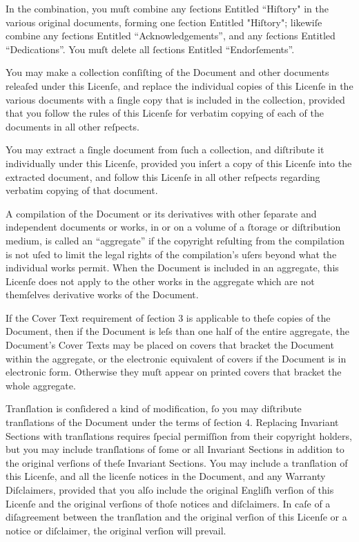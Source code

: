 In the combination, you muſt combine any ſections Entitled “Hiſtory" in 
the various original documents, forming one ſection Entitled "Hiſtory"; 
likewiſe combine any ſections Entitled “Acknowledgements”, and any 
ſections Entitled “Dedications”. You muſt delete all ſections Entitled 
“Endorſements”.


You may make a collection conſiſting of the Document and other documents 
releaſed under this Licenſe, and replace the individual copies of this 
Licenſe in the various documents with a ſingle copy that is included in 
the collection, provided that you follow the rules of this Licenſe for 
verbatim copying of each of the documents in all other reſpects.

You may extract a ſingle document from ſuch a collection, and diſtribute 
it individually under this Licenſe, provided you inſert a copy of this 
Licenſe into the extracted document, and follow this Licenſe in all 
other reſpects regarding verbatim copying of that document.


A compilation of the Document or its derivatives with other ſeparate and 
independent documents or works, in or on a volume of a ſtorage or 
diſtribution medium, is called an “aggregate” if the copyright reſulting 
from the compilation is not uſed to limit the legal rights of the 
compilation’s uſers beyond what the individual works permit. When the 
Document is included in an aggregate, this Licenſe does not apply to the 
other works in the aggregate which are not themſelves derivative works 
of the Document.

If the Cover Text requirement of ſection 3 is applicable to theſe copies 
of the Document, then if the Document is leſs than one half of the 
entire aggregate, the Document’s Cover Texts may be placed on covers 
that bracket the Document within the aggregate, or the electronic 
equivalent of covers if the Document is in electronic form. Otherwise 
they muſt appear on printed covers that bracket the whole aggregate.



Tranſlation is conſidered a kind of modification, ſo you may diſtribute 
tranſlations of the Document under the terms of ſection 4. Replacing 
Invariant Sections with tranſlations requires ſpecial permiſſion from 
their copyright holders, but you may include tranſlations of ſome or all 
Invariant Sections in addition to the original verſions of theſe 
Invariant Sections. You may include a tranſlation of this Licenſe, and 
all the licenſe notices in the Document, and any Warranty Diſclaimers, 
provided that you alſo include the original Engliſh verſion of this 
Licenſe and the original verſions of thoſe notices and diſclaimers. In 
caſe of a diſagreement between the tranſlation and the original verſion 
of this Licenſe or a notice or diſclaimer, the original verſion will 
prevail.

